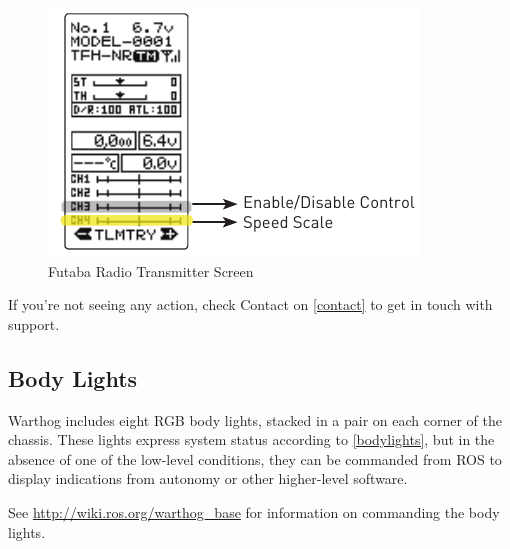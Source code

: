 \documentclass[]{clearpath-latex/clearpath-manual}
\begin{document}
\begin{figure}[!h]
  \centering
  \includegraphics[width=1.0\linewidth]{futaba-screen.pdf}
  \caption{Futaba Radio Transmitter Screen}
  \label{futaba-screen}
\end{figure}

If you’re not seeing any action, check Contact on \autoref{contact} to get in touch with support.


\pagebreak[4]
\subsection{Body Lights}

Warthog includes eight RGB body lights, stacked in a pair on each corner of the chassis. These lights express system status according to \autoref{bodylights}, but in the absence of one of the low-level conditions, they can be commanded from ROS to display indications from autonomy or other higher-level software.

See \url{http://wiki.ros.org/warthog_base} for information on commanding the body lights.
\end{document}
